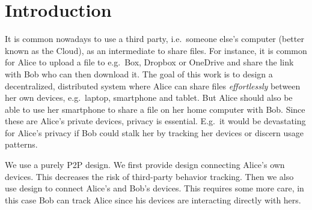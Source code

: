 \section{Introduction}


It is common nowadays to use a third party, i.e.\ someone else's computer (better 
known as the Cloud), as an intermediate to share files.
For instance, it is common for Alice to upload a file to e.g.\ Box, Dropbox or 
OneDrive and share the link with Bob who can then download it.
The goal of this work is to design a decentralized, distributed system where 
Alice can share files \emph{effortlessly} between her own devices, e.g.\ laptop, 
smartphone and tablet.
But Alice should also be able to use her smartphone to share a file on her home 
computer with Bob.
Since these are Alice's private devices, privacy is essential.
E.g.\ it would be devastating for Alice's privacy if Bob could stalk her by 
tracking her devices or discern usage patterns.




We use a purely \ac{P2P} design.
We first provide  design connecting Alice's own devices.
This decreases the risk of third-party behavior tracking.
Then we also use  design to connect Alice's and Bob's devices.
This requires some more care, in this case Bob can track Alice since his devices 
are interacting directly with hers.


